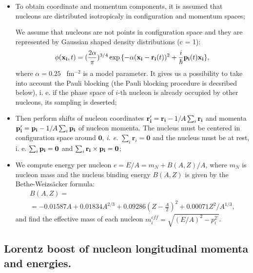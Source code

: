 \begin{itemize}
\item To obtain coordinate and momentum components, it
 is assumed that nucleons are distributed isotropicaly in configuration
 and momentum spaces;

We assume \cite{URQMD97}
that nucleons are not points in configuration space
and they are represented by Gaussian shaped density distributions (c = 1):
\begin{equation}
\label{KNIS7}\phi({\bf x_i}, t) = (\frac{2\alpha}{\pi})^{3/4}
\exp{\{-\alpha ({\bf x_i}
- {\bf r_i} (t))^2 + \frac{i}{\hbar}{\bf p_i} (t) {\bf x_i}\}}, 
\end{equation}
where $\alpha=0.25$ \ fm$^{-2}$ is a model parameter.
It gives us a possibility to take into account 
the Pauli blocking (the Pauli blocking procedure is decsribed below), 
i. e. if the phase space of $i$-th nucleon is already occupied by other
nucleons, its sampling is deserted;

\item Then perform shifts of nucleon coordinates ${\bf r_i^{\prime}}
= {\bf r_i} - 1/A \sum_i {\bf r_i}$ and momenta ${\bf p_i^{\prime}}
= {\bf p_i} - 1/A \sum_i {\bf p_i}$ 
of nucleon momenta. The nucleus must be centered in configuration space around
$\mathbf{0}$, \textit{i. e.} $\sum_i {\mathbf{r}_i} = \mathbf{0}$ and
 the nucleus must be at rest, i. e. $\sum_i {\bf p_i} = \bf 0$ and
$\sum_i {\bf r_i} \times {\bf p_i}={\bf 0}$;

\item We compute energy per nucleon $e = E/A = m_{N} + B(A,Z)/A$, 
where $m_N$ is nucleon mass and the nucleus binding energy $B(A,Z)$ is given  
by the Bethe-Weizs\"acker formula\cite{BM69}:
\begin{equation}
\begin{array}{c}
\label{KNIS8} B(A,Z) = \\
= -0.01587A + 0.01834A^{2/3} + 0.09286(Z- \frac{A}{2})^2 +
0.00071 Z^2/A^{1/3},
\end{array}
\end{equation} 
 and find the effective mass of each nucleon $m^{eff}_i = 
\sqrt{(E/A)^2 - p^{2\prime}_i}$.
\end{itemize}

\subsection{Lorentz boost of nucleon longitudinal momenta and energies.}

